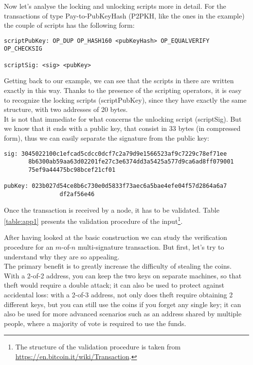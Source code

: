 \bigskip
\noindent
Now let's analyse the locking and unlocking scripts more in detail. For the transactions of type Pay-to-PubKeyHash (P2PKH, like the ones in the example) the couple of scripts has the following form:

\bigskip
\begin{lstlisting}[frame=single]
scriptPubKey: OP_DUP OP_HASH160 <pubKeyHash> OP_EQUALVERIFY 							 OP_CHECKSIG

scriptSig: <sig> <pubKey>
\end{lstlisting}

\bigskip
\noindent
Getting back to our example, we can see that the scripts in there are written exactly in this way. Thanks to the presence of the scripting operators, it is easy to recognize the locking scripts (scriptPubKey), since they have exactly the same structure, with two addresses of 20 bytes.
\\
It is not that immediate for what concerns the unlocking script (scriptSig). But we know that it ends with a public key, that consist in 33 bytes (in compressed form), thus we can easily separate the signature from the public key:

\bigskip

\begin{lstlisting}[frame=single]
sig: 3045022100c1efcad5cdcc0dcf7c2a79d9e1566523af9c7229c78ef71ee
	   8b6300ab59aa63d02201fe27c3e6374dd3a5425a577d9ca6ad8ff079001
	   75ef9a44475bc98bcef21cf01
	   
pubKey: 023b027d54ce8b6c730e0d5833f73aec6a5bae4efe04f57d2864a6a7
				df2af56e46
\end{lstlisting}
Once the transaction is received by a node, it has to be validated. Table \ref{table:app1} presents the validation procedure of the input\footnote{The structure of the validation procedure is taken from \url{https://en.bitcoin.it/wiki/Transaction}.}.

\bigskip
\noindent
After having looked at the basic construction we can study the verification procedure for an $m$-of-$n$ multi-signature transaction. But first, let's try to understand why they are so appealing. 
\\
The primary benefit is to greatly increase the difficulty of stealing the coins. With a 2-of-2 address, you can keep the two keys on separate machines, so that theft would require a double attack; it can also be used to protect against accidental loss: with a 2-of-3 address, not only does theft require obtaining 2 different keys, but you can still use the coins if you forget any single key; it can also be used for more advanced scenarios such as an address shared by multiple people, where a majority of vote is required to use the funds.

